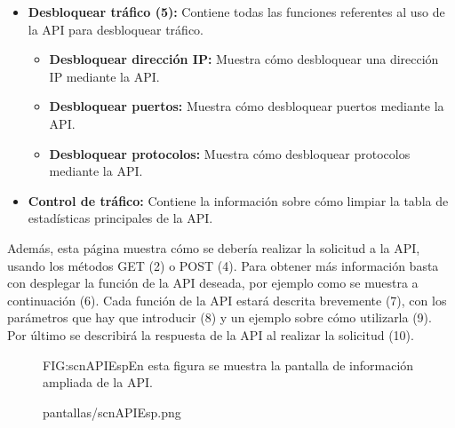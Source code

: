 \begin{itemize}
\begin{itemize}
\item \textbf{Bloquear puertos: }Muestra cómo bloquear puertos mediante la API.
\item \textbf{Bloquear protocolos: }Muestra cómo bloquear protocolos mediante la API.
\end{itemize}
\item \textbf{Desbloquear tráfico (5): }Contiene todas las funciones referentes al uso de la API para desbloquear tráfico.
\begin{itemize}
\item \textbf{Desbloquear dirección IP:} Muestra cómo desbloquear una dirección IP mediante la API.
\item \textbf{Desbloquear puertos: }Muestra cómo desbloquear puertos mediante la API.
\item \textbf{Desbloquear protocolos:} Muestra cómo desbloquear protocolos mediante la API.
\end{itemize}
\item \textbf{Control de tráfico: }Contiene la información sobre cómo limpiar la tabla de estadísticas principales de la API.
\end{itemize}

Además, esta página muestra cómo se debería realizar la solicitud a la API, usando los métodos GET (2) o POST (4). Para obtener más información basta con desplegar la función de la API deseada, por ejemplo como se muestra a continuación (6). Cada función de la API estará descrita brevemente (7), con los parámetros que hay que introducir (8) y un ejemplo sobre cómo utilizarla (9). Por último se describirá la respuesta de la API al realizar la solicitud (10).


\begin{figure}[Pantalla información ampliada de la API]{FIG:scnAPIEsp}{En esta figura se muestra la pantalla de información ampliada de la API.}
  \begin{image}{}{}{pantallas/scnAPIEsp.png}
  \end{image}
\end{figure}
